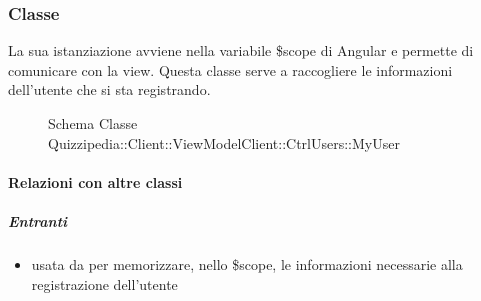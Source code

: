\subsubsection{Classe }
La sua istanziazione avviene nella variabile \$scope di Angular e permette di comunicare con la view. Questa classe serve a raccogliere le informazioni dell'utente che si sta registrando.
\begin{figure}[H]
\centering
\noindent{}
\caption[Schema Classe MyUser]{Schema Classe Quizzipedia::Client::ViewModelClient::CtrlUsers::MyUser}
\end{figure}
\paragraph{Relazioni con altre classi}
\subparagraph{Entranti}
\begin{itemize}
\item usata da  per memorizzare, nello \$scope, le informazioni necessarie alla registrazione dell'utente
\end{itemize}
